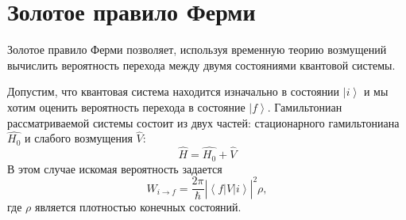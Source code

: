 \section{Золотое правило Ферми}
Золотое правило Ферми позволяет, используя временную теорию возмущений
вычислить вероятность перехода между двумя состояниями квантовой
системы.

\begin{theorem}
  \label{addQuantGoldenRuleFermi}
  Допустим, что квантовая система находится изначально в состоянии
  $\left|i\right>$ и мы хотим оценить вероятность перехода в состояние 
  $\left|f\right>$. Гамильтониан рассматриваемой системы состоит из
  двух частей: стационарного гамильтониана $\hat{H_0}$ и слабого
  возмущения $\hat{V}$:
  \begin{equation}
    \hat{H} = \hat{H_0} + \hat{V}
    \nonumber
  \end{equation}
  В этом случае искомая вероятность задается
  \begin{equation}
    W_{i \rightarrow f} = \frac{2 \pi}{\hbar}
    \left|
    \left<
    f
    \right|
    \hat{V}
    \left|
    i
    \right>
    \right|^2 \rho
    \nonumber,
  \end{equation}
  где $\rho$ является плотностью конечных состояний.
\end{theorem}

